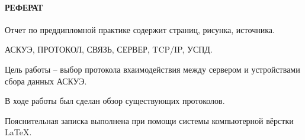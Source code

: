 \newpage
{}
\paragraph*{\hfill РЕФЕРАТ \hfill}
Отчет по преддипломной практике содержит  страниц,  рисунка,  источника. %

АСКУЭ, ПРОТОКОЛ, СВЯЗЬ, СЕРВЕР, TCP/IP, УСПД.

Цель работы -- выбор протокола вхаимодействия между сервером и устройствами сбора данных АСКУЭ.

В ходе работы был сделан обзор существующих протоколов.

Пояснительная записка выполнена при помощи системы компьютерной вёрстки \LaTeX.